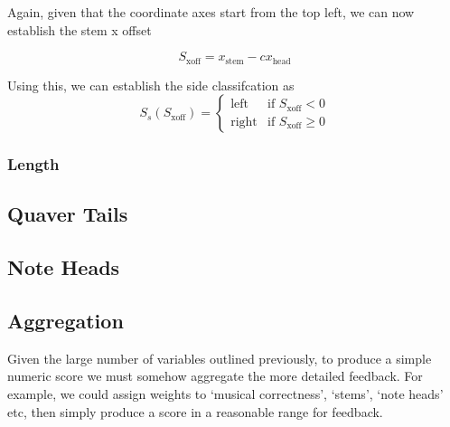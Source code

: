 Again, given that the coordinate axes start from the top left, we can now establish the stem x offset

$$
S_\text{xoff} = x_{\text{stem}} - cx_{\text{head}}
$$

Using this, we can establish the side classifcation as
$$
S_{s} (S_\text{xoff}) =
\left\{
	\begin{array}{ll}
		\text{left}   & \mbox{if } S_\text{xoff} < 0 \\
		\text{right}  & \mbox{if } S_\text{xoff} \ge 0
	\end{array}
\right.
$$


\subsubsection{Length}

\subsection{Quaver Tails}

\subsection{Note Heads}

\subsection{Aggregation}
Given the large number of variables outlined previously, to produce a simple numeric score we must somehow aggregate the more detailed feedback. For example, we could assign weights to `musical correctness', `stems', `note heads' etc, then simply produce a score in a reasonable range for feedback.